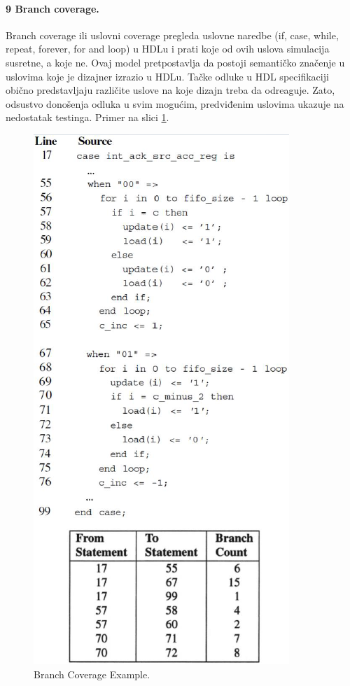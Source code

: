 \documentclass[a4paper, 12pt]{article}
\begin{document}
\paragraph{9 Branch coverage.}
\hfill \break
\indent Branch coverage ili uslovni coverage pregleda uslovne naredbe (if, case, while, repeat, forever, for and loop) u HDLu i prati koje od ovih uslova simulacija susretne, a koje ne. Ovaj model pretpostavlja da postoji semantičko značenje u uslovima koje je dizajner izrazio u HDLu. Tačke odluke u HDL specifikaciji obično predstavljaju različite uslove na koje dizajn treba da odreaguje. Zato, odsustvo donošenja odluka u svim mogućim, predviđenim uslovima ukazuje na nedostatak testinga. Primer na slici \ref{img-p10-6}.
\begin{figure}[h!]
\centering
\includegraphics[scale=0.6]{img-p10-6.png}
\caption{Branch Coverage Example.}
\label{img-p10-6}
\end{figure}
\end{document}
